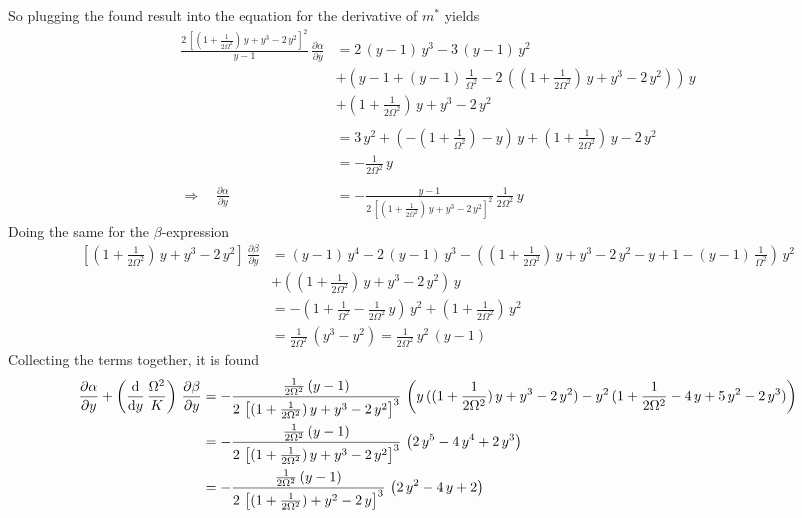 \documentclass{article}
\begin{document}
\begin{appendices}
So plugging the found result into the equation for the derivative of $m^*$ yields
\begin{align*}
    \frac{2\,\left[(1+\frac{1}{2\Omega^2})\,{y}+{y}^3-2\,{y}^2\right]^2}{{y}-1}\,\frac{\partial \alpha}{\partial{y}}&=2\,({y}-1)\,{y}^3-3\,({y}-1)\,{y}^2\\
    &+\left( {y}-1+({y}-1)\,\frac{1}{\Omega^2}-2\,\left((1+\frac{1}{2\Omega^2})\,{y}+{y}^3-2\,{y}^2\right) \right)\,{y}\\
    &+(1+\frac{1}{2\Omega^2})\,{y}+{y}^3-2\,{y}^2 \\\\
    &=3\,{y}^2+\left( -(1+\frac{1}{\Omega^2})-{y}\right)\,{y}+(1+\frac{1}{2\Omega^2})\,{y}-2\,{y}^2\\
    &=-\frac{1}{2\Omega^2}\,{y}\\\\
    \Rightarrow\quad\frac{\partial \alpha}{\partial{y}}&=-\frac{{y}-1}{2\,\left[(1+\frac{1}{2\Omega^2})\,{y}+{y}^3-2\,{y}^2\right]^2}\,\frac{1}{2\Omega^2}\,{y}
\end{align*}
Doing the same for the $\beta$-expression
\begin{align*}
    \left[(1+\frac{1}{2\Omega^2})\,{y}+{y}^3-2\,{y}^2\right]\,\frac{\partial \beta}{\partial{y}}&=({y}-1)\,{y}^4-2\,({y}-1)\,{y}^3-\left( (1+\frac{1}{2\Omega^2})\,{y}+{y}^3-2\,{y}^2-{y}+1-({y}-1)\,\frac{1}{\Omega^2} \right)\,{y}^2\\
    &+((1+\frac{1}{2\Omega^2})\,{y}+{y}^3-2\,{y}^2)\,{y}\\
    &=-\left( 1+\frac{1}{\Omega^2}-\frac{1}{2\Omega^2}\,{y}  \right)\,{y}^2+(1+\frac{1}{2\Omega^2})\,{y}^2\\
    &=\frac{1}{2\Omega^2}\,({y}^3-{y}^2)=\frac{1}{2\Omega^2}\,{y}^2\,({y}-1)
\end{align*}
Collecting the terms together, it is found
\begin{align*}
    \frac{\partial \alpha}{\partial{y}}+\dkw\,\frac{\partial \beta}{\partial{y}}&=-\frac{\frac{1}{2\Omega^2}\,({y}-1)}{2\,\left[(1+\frac{1}{2\Omega^2})\,{y}+{y}^3-2\,{y}^2\right]^3}\,\left( {y}\,((1+\frac{1}{2\Omega^2})\,{y}+{y}^3-2\,{y}^2) -{y}^2\,(1+\frac{1}{2\Omega^2}-4\,{y}+5\,{y}^2-2\,{y}^3)\right)\\
    &=-\frac{\frac{1}{2\Omega^2}\,({y}-1)}{2\,\left[(1+\frac{1}{2\Omega^2})\,{y}+{y}^3-2\,{y}^2\right]^3}\,\left( 2\,{y}^5-4\,{y}^4+2\,{y}^3 \right)\\
    &=-\frac{\frac{1}{2\Omega^2}\,({y}-1)}{2\,\left[(1+\frac{1}{2\Omega^2})+{y}^2-2\,{y}\right]^3}\,\left( 2\,{y}^2-4\,{y}+2 \right)

\end{align*}
\end{appendices}
\end{document}

